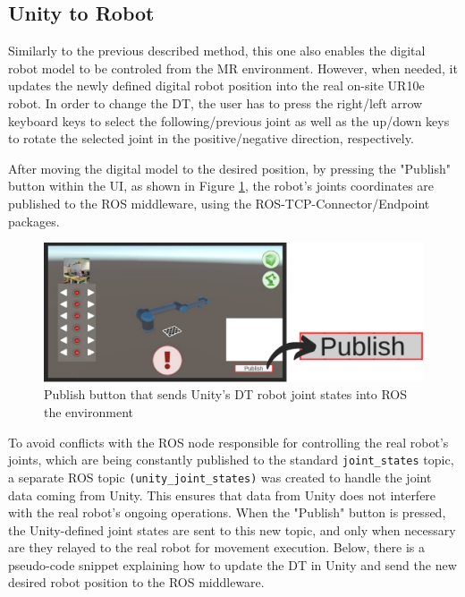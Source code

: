    

\subsection{Unity to Robot}
Similarly to the previous described method, this one also enables the digital robot model to be controled from the \ac{MR} environment. However, when needed, it updates the newly defined digital robot position into the real on-site UR10e robot. In order to change the \ac{DT}, the user has to press the right/left arrow keyboard keys to select the following/previous joint as well as the up/down keys to rotate the selected joint in the positive/negative direction, respectively.
        
After moving the digital model to the desired position, by pressing the "Publish" button within the \ac{UI}, as shown in Figure \ref{fig:publish_UI_button}, the robot's joints coordinates are published to the \ac{ROS} middleware, using the \ac{ROS}-\ac{TCP}-Connector/Endpoint packages.


\begin{figure}[htpb]
    \centering
    \includegraphics[width=0.8\linewidth]{figs/publish-button.png}
    \caption{Publish button that sends Unity's \ac{DT} robot joint states into ROS the environment}
    \label{fig:publish_UI_button}
\end{figure}

To avoid conflicts with the \ac{ROS} node responsible for controlling the real robot's joints, which are being constantly published to the standard \texttt{joint\_states} topic, a separate \ac{ROS} topic \texttt{(unity\_joint\_states)} was created to handle the joint data coming from Unity. This ensures that data from Unity does not interfere with the real robot’s ongoing operations. When the "Publish" button is pressed, the Unity-defined joint states are sent to this new topic, and only when necessary are they relayed to the real robot for movement execution. Below, there is a pseudo-code snippet explaining how to update the \ac{DT} in Unity and send the new desired robot position to the \ac{ROS} middleware.

